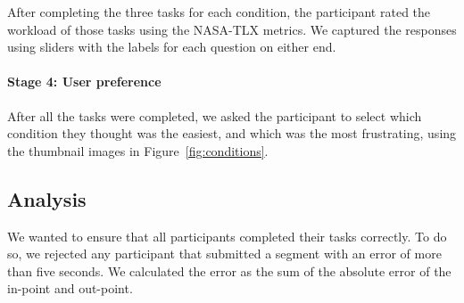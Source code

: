 
After completing the three tasks for each condition, the participant rated the workload of those tasks
using the NASA-TLX metrics. We captured the responses using sliders with the labels for each question on either end.

\paragraph{Stage 4: User preference}
After all the tasks were completed, we asked the participant to select which condition they thought was the easiest,
and which was the most frustrating, using the thumbnail images in Figure~\ref{fig:conditions}.

\subsection{Analysis}
We wanted to ensure that all participants completed their tasks correctly.  To do so, we rejected any participant that
submitted a segment with an error of more than five seconds. We calculated the error as the sum of the absolute error
of the in-point and out-point.


